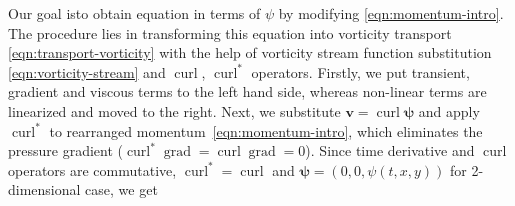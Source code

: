 \documentclass{article}
\numberwithin{equation}{section}
\begin{document}
Our goal isto obtain equation in terms of $\psi$ by modifying \cref{eqn:momentum-intro}. 
The procedure lies in transforming this equation into vorticity transport \cref{eqn:transport-vorticity} with the help of vorticity stream function substitution \cref{eqn:vorticity-stream} and $\operatorname{curl}$, $\operatorname{curl}^*$ operators. 
Firstly, we put transient, gradient and viscous terms to the left hand side, whereas non-linear terms are linearized and moved to the right. 
Next, we substitute $\boldsymbol{v}=\operatorname{curl}\boldsymbol{\psi}$ and apply $\operatorname{curl}^*$ to rearranged momentum~\cref{eqn:momentum-intro}, which eliminates the pressure gradient ($\operatorname{curl}^*\operatorname{grad}=\operatorname{curl}\operatorname{grad}=0$). 
Since time derivative and $\operatorname{curl}$ operators are commutative, $\operatorname{curl}^*=\operatorname{curl}$ and $\boldsymbol{\psi}=(0,0,\psi(t,x,y))$ for 2-dimensional case, we get 
\end{document}
